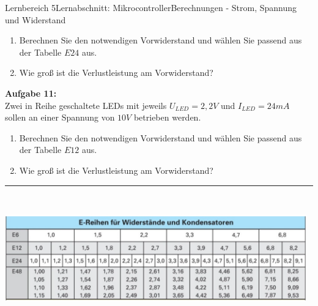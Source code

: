 \documentclass[oneside,openany,headings=optiontotoc,11pt,numbers=noenddot]{scrreprt}
\begin{document}
\begin{worksheet}{Lernbereich 5}{Lernabschnitt: Mikrocontroller}{Berechnungen - Strom, Spannung und Widerstand}
\begin{framed}
\begin{enumerate}[label=(\alph*)]
					\item Berechnen Sie den notwendigen Vorwiderstand und wählen Sie passend aus der Tabelle \(E24\) aus.
					\item Wie groß ist die Verlustleistung am Vorwiderstand?
				\end{enumerate}
				\par\noindent
				\textbf{Aufgabe 11:}\\
				Zwei in Reihe geschaltete LEDs mit jeweils \(U_{LED} = 2,2V\) und \(I_{LED} = 24mA\) sollen an einer Spannung von \(10V\) betrieben werden.
				\begin{enumerate}[label=(\alph*)]
					\item Berechnen Sie den notwendigen Vorwiderstand und wählen Sie passend aus der Tabelle \(E12\) aus.
					\item Wie groß ist die Verlustleistung am Vorwiderstand?
				\end{enumerate}
				\par\noindent
				\rule{0.98\textwidth}{0.1pt}\\
				\par\noindent
				\includegraphics[width=0.98\textwidth]{../99_Bilder/eReihe.png}
			\end{framed}
		\end{worksheet}	
\end{document}
